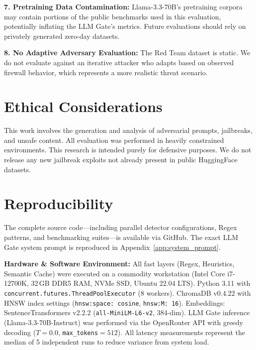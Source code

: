 \documentclass[conference]{IEEEtran}
\begin{document}
\textbf{7. Pretraining Data Contamination:} Llama-3.3-70B's pretraining corpora may contain portions of the public benchmarks used in this evaluation, potentially inflating the LLM Gate's metrics. Future evaluations should rely on privately generated zero-day datasets.

\textbf{8. No Adaptive Adversary Evaluation:} The Red Team dataset is static. We do not evaluate against an iterative attacker who adapts based on observed firewall behavior, which represents a more realistic threat scenario.

\section{Ethical Considerations}

This work involves the generation and analysis of adversarial prompts, jailbreaks, and unsafe content. All evaluation was performed in heavily constrained environments. This research is intended purely for defensive purposes. We do not release any new jailbreak exploits not already present in public HuggingFace datasets.

\section{Reproducibility}

The complete source code---including parallel detector configurations, Regex patterns, and benchmarking suites---is available via GitHub. The exact LLM Gate system prompt is reproduced in Appendix~\ref{app:system_prompt}.

\textbf{Hardware \& Software Environment:} All fast layers (Regex, Heuristics, Semantic Cache) were executed on a commodity workstation (Intel Core i7-12700K, 32\,GB DDR5 RAM, NVMe SSD, Ubuntu 22.04 LTS). Python 3.11 with \texttt{concurrent.futures.ThreadPoolExecutor} (8 workers). ChromaDB v0.4.22 with HNSW index settings (\texttt{hnsw:space: cosine}, \texttt{hnsw:M: 16}). Embeddings: SentenceTransformers v2.2.2 (\texttt{all-MiniLM-L6-v2}, 384-dim). LLM Gate inference (Llama-3.3-70B-Instruct) was performed via the OpenRouter API with greedy decoding ($T{=}0.0$, \texttt{max\_tokens}$=512$). All latency measurements represent the median of 5 independent runs to reduce variance from system load.
\end{document}
